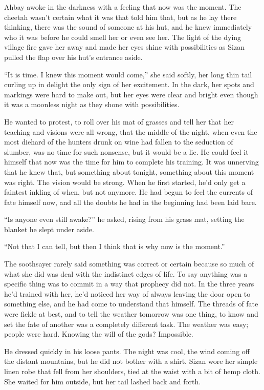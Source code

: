 Ahbay awoke in the darkness with a feeling that now was the moment. The cheetah wasn't certain what it was that told him that, but as he lay there thinking, there was the sound of someone at his hut, and he knew immediately who it was before he could smell her or even see her. The light of the dying village fire gave her away and made her eyes shine with possibilities as Sizan pulled the flap over his hut's entrance aside.

``It is time. I knew this moment would come,'' she said softly, her long thin tail curling up in delight the only sign of her excitement. In the dark, her spots and markings were hard to make out, but her eyes were clear and bright even though it was a moonless night as they shone with possibilities.

He wanted to protest, to roll over his mat of grasses and tell her that her teaching and visions were all wrong, that the middle of the night, when even the most diehard of the hunters drunk on wine had fallen to the seduction of slumber, was no time for such nonsense, but it would be a lie. He could feel it himself that now was the time for him to complete his training. It was unnerving that he knew that, but something about tonight, something about this moment was right. The vision would be strong. When he first started, he'd only get a faintest inkling of when, but not anymore. He had begun to feel the currents of fate himself now, and all the doubts he had in the beginning had been laid bare.

``Is anyone even still awake?'' he asked, rising from his grass mat, setting the blanket he slept under aside.

``Not that I can tell, but then I think that is why now is the moment.''

The soothsayer rarely said something was correct or certain because so much of what she did was deal with the indistinct edges of life. To say anything was a specific thing was to commit in a way that prophecy did not. In the three years he'd trained with her, he'd noticed her way of always leaving the door open to something else, and he had come to understand that himself. The threads of fate were fickle at best, and to tell the weather tomorrow was one thing, to know and set the fate of another was a completely different task. The weather was easy; people were hard. Knowing the will of the gods? Impossible.

He dressed quickly in his loose pants. The night was cool, the wind coming off the distant mountains, but he did not bother with a shirt. Sizan wore her simple linen robe that fell from her shoulders, tied at the waist with a bit of hemp cloth. She waited for him outside, but her tail lashed back and forth.


